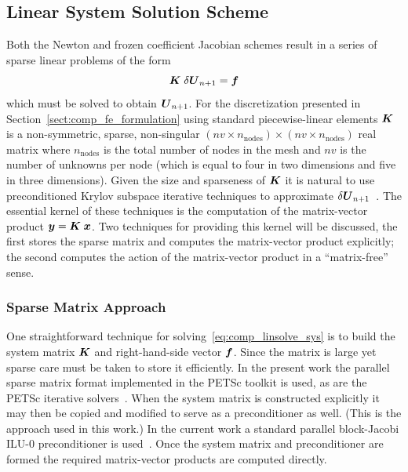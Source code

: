 \subsection{Linear System Solution Scheme}
Both the Newton and frozen coefficient Jacobian schemes result in a series of sparse linear problems of the form
\begin{equation}
  {\boldsymbol{K}}\;\delta{\boldsymbol{U}}_{n+1}={\boldsymbol{f}}
  \label{eq:comp_linsolve_sys}
\end{equation}
which must be solved to obtain ${\boldsymbol{U}}_{n+1}$.  For the discretization presented in Section~\ref{sect:comp_fe_formulation} using standard piecewise-linear elements ${\boldsymbol{K}}$ is a non-symmetric, sparse, non-singular $\left(nv\times n_{\text{nodes}}\right)\times\left(nv\times n_{\text{nodes}}\right)$ real matrix where $n_{\text{nodes}}$ is the total number of nodes in the mesh and $nv$ is the number of unknowns per node (which is equal to four in two dimensions and five in three dimensions).  Given the size and sparseness of ${\boldsymbol{K}}$ it is natural to use preconditioned Krylov subspace iterative techniques to approximate $\delta{\boldsymbol{U}}_{n+1}$~\cite{barrett94templates,golub_van_loan}.  The essential kernel of these techniques is the computation of the matrix-vector product ${\boldsymbol{y}}={\boldsymbol{K}}\;{\boldsymbol{x}}$.  Two techniques for providing this kernel will be discussed, the first stores the sparse matrix and computes the matrix-vector product explicitly; the second computes the action of the matrix-vector product in a ``matrix-free'' sense.

\subsubsection{Sparse Matrix Approach}
One straightforward technique for solving~\eqref{eq:comp_linsolve_sys} is to build the system matrix ${\boldsymbol{K}}$ and right-hand-side vector ${\boldsymbol{f}}$.  Since the matrix is large yet sparse care must be taken to store it efficiently.  In the present work the parallel sparse matrix format implemented in the PETSc toolkit is used, as are the PETSc iterative solvers~\cite{petsc_manual}.  When the system matrix is constructed explicitly it may then be copied and modified to serve as a preconditioner as well.  (This is the approach used in this work.)  In the current work a standard parallel block-Jacobi ILU-0 preconditioner is used~\cite{barrett94templates,golub_van_loan}.  Once the system matrix and preconditioner are formed the required matrix-vector products are computed directly.



